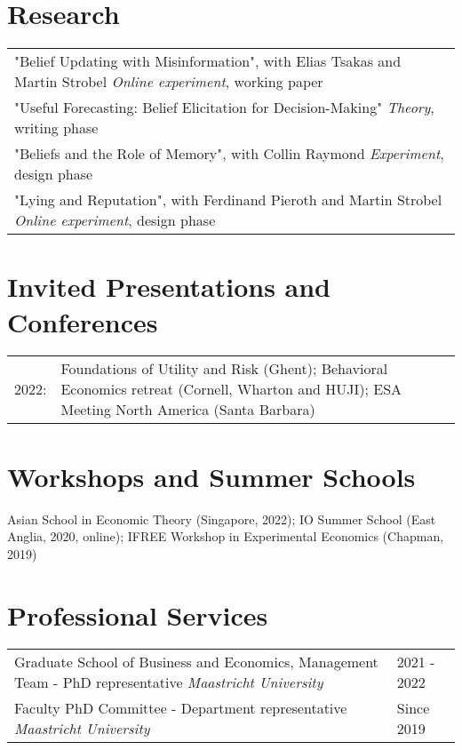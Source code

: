\documentclass[11pt]{article}
\begin{document}
\section{Research}
\noindent\begin{tabular}{L{17cm}}
	"Belief Updating with Misinformation", with Elias Tsakas and Martin Strobel \newline  \textit{Online experiment}, working paper \\
	\rule{0pt}{4ex}"Useful Forecasting: Belief Elicitation for Decision-Making" \newline  \textit{Theory}, writing phase \\
	\rule{0pt}{4ex}"Beliefs and the Role of Memory", with Collin Raymond \newline  \textit{Experiment}, design phase \\
	\rule{0pt}{4ex}"Lying and Reputation", with Ferdinand Pieroth and Martin Strobel \newline  \textit{Online experiment}, design phase \\
\end{tabular}


\section{Invited Presentations and Conferences}

\noindent\begin{tabular}{L{1cm}L{15cm}}
	2022: &  Foundations of Utility and Risk (Ghent); Behavioral Economics retreat (Cornell, Wharton and HUJI); ESA Meeting North America (Santa Barbara)
\end{tabular}



\section{Workshops and Summer Schools}

\noindent Asian School in Economic Theory (Singapore, 2022); IO Summer School (East Anglia, 2020, online); IFREE Workshop in Experimental Economics (Chapman, 2019)



\section{Professional Services}
 
\noindent\begin{tabular}{L{14cm}L{3cm}}
	\rule{0pt}{4ex}Graduate School of Business and Economics, Management Team - PhD representative \newline \textit{Maastricht University} & 2021 - 2022   \\
	\rule{0pt}{4ex}Faculty PhD Committee - Department representative \newline \textit{Maastricht University}  & Since 2019 
\end{tabular}
\end{document}
